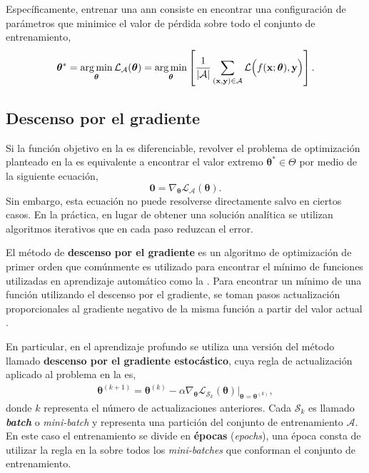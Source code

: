Específicamente, entrenar una \acrshort{ann} consiste en encontrar una configuración de parámetros que minimice el valor de pérdida sobre todo el conjunto de entrenamiento, 
\begin{align}
    \bm\theta^{*} =\operatorname*{arg\,min}_{\bm\theta}\mathcal{L}_{\mathcal{A}}(\bm\theta) = \operatorname*{arg\,min}_{\bm\theta} 
    \left[
    \frac{1}{|\mathcal{A}|}
    \sum_{(\mathbf{x}, \mathbf{y}) \in \mathcal{A}} \mathcal{L}\Big(f(\mathbf{x};\bm\theta), \mathbf{y}\Big)
    \right].
    \label{eq:min_train_loss}
\end{align}
\subsection{Descenso por el gradiente}
\label{sec:gradient_decent}
Si la función objetivo en la  es diferenciable, revolver el problema de optimización planteado en la  es equivalente a encontrar el valor extremo $\bm\theta^{*}\in\Theta$ por medio de la siguiente ecuación,
$$\mathbf{0}=\nabla_{\bm\theta}\mathcal{L}_{\mathcal{A}}(\bm\theta).$$
Sin embargo, esta ecuación no puede resolverse directamente salvo en ciertos casos. En la práctica, en lugar de obtener una solución analítica se utilizan algoritmos iterativos que en cada paso reduzcan el error.

El método de \textbf{descenso por el gradiente} es un algoritmo de optimización de primer orden que comúnmente es utilizado para encontrar el mínimo de funciones utilizadas en aprendizaje automático como la  \cite{Roberts_2022}.
Para encontrar un mínimo de una función utilizando el descenso por el gradiente, se toman pasos actualización proporcionales al gradiente negativo de la misma función a partir del valor actual \cite{mml-book2020}.

En particular, en el aprendizaje profundo se utiliza una versión del método llamado \textbf{descenso por el gradiente estocástico}, cuya regla de actualización aplicado al problema en la  es,
\begin{align}
    \bm\theta^{(k+1)} = \bm\theta^{(k)} - \alpha \nabla_{\bm\theta}\mathcal{L}_{\mathcal{S}_{k}}(\bm\theta)\Big|_{\bm\theta = \bm\theta^{(k)}},
    \label{eq:SGD}
\end{align}
donde $k$ representa el número de actualizaciones anteriores. Cada $\mathcal{S}_{k}$ es llamado 
\textbf{\textit{batch}} o \textit{mini-batch} y representa una partición del conjunto de entrenamiento $\mathcal{A}$. En este caso el entrenamiento se divide en \textbf{épocas} (\textit{epochs}), una época consta de utilizar la regla en la  sobre todos los \textit{mini-batches} que conforman el conjunto de entrenamiento. \cite{Roberts_2022} 




